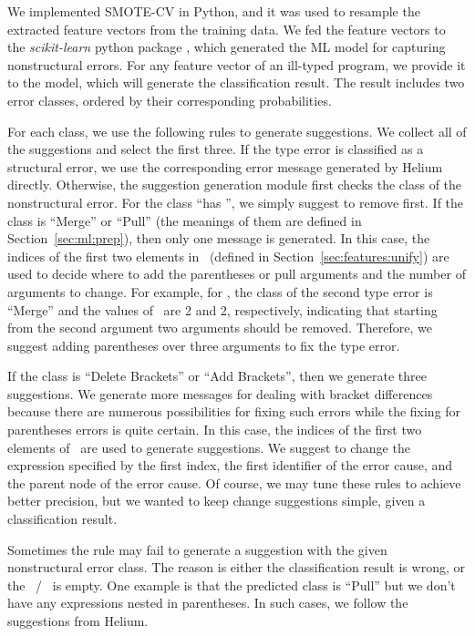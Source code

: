 \documentclass[12pt]{report}	%
\begin{document}
We implemented SMOTE-CV in Python,
and it was used to resample the extracted feature vectors from the training data.
We fed the feature vectors to the \emph{scikit-learn} python package \cite{scikit-learn}, 
which generated the ML model for capturing nonstructural errors.
%
For any feature vector
of an ill-typed program, we provide it to the model, which will
generate the classification result. The result
includes two error classes, ordered by their corresponding probabilities.

For each class, we use the following rules to generate suggestions.
We collect all of the suggestions and select the first three.
If the type error is classified as a structural error,
we use the corresponding error message generated by Helium directly.
Otherwise, the suggestion generation module 
first checks the class of the
%
nonstructural error. 
For the class ``has \prog{\$}'', 
we simply suggest to remove \prog{\$} first. 
If the class is ``Merge''
or ``Pull'' (the meanings of them are defined
in Section~\ref{sec:ml:prep}), then only one message is
generated. In this case, the
indices of the first two elements in \FuncDiff\ (defined in
Section~\ref{sec:features:unify}) are used to
decide where to add the parentheses or pull
arguments and the number of arguments to change.
For example, for , the class of the second type error is ``Merge''
and the values of \FuncDiff\ are 2 and 2, respectively, indicating that starting from the
second argument two arguments should be removed.
Therefore, we suggest adding parentheses over three arguments to fix the type error.

If the class is ``Delete Brackets''
or ``Add Brackets'', then we generate three suggestions.
We generate more messages for dealing with bracket
differences because there are numerous possibilities for
fixing such errors while the fixing for parentheses
errors is quite certain. In this case,
the indices of the first two elements of
\BracketDiff\ are used to generate suggestions. We suggest
to change the expression specified by the first index, the
first identifier of the error cause, and the
parent node of the error cause. Of course, we may tune
these rules to achieve better precision, but we wanted
to keep change suggestions simple, given a classification result.

Sometimes the rule may fail to generate a suggestion with
the given nonstructural error class. 
The reason is either the
classification result is wrong, 
or the \FuncDiff\ / \BracketDiff\ is empty. 
One example is that
the predicted class is ``Pull''
but we don't have any expressions
nested in parentheses. 
In such cases, 
we follow the suggestions from Helium.
\end{document}
